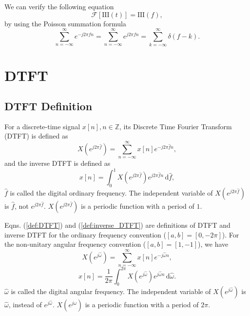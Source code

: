 \documentclass[journal,twoside]{IEEEtran}
\newcommand{\dd}{\,\mathrm{d}}
\begin{document}
We can verify the following equation
\begin{equation}
\mathscr{F}[\mathrm{III}(t)]=\mathrm{III}(f),\label{eqn:ctft_delta_comb}
\end{equation}
by using the Poisson summation formula \cite{ref:benedetto1997} 
\begin{equation}
\sum_{n=-\infty}^{\infty}e^{-j 2\pi f n} = \sum_{n=-\infty}^{\infty}e^{j 2\pi f n}=\sum_{k=-\infty}^{\infty}\delta(f-k).\label{eqn:Poisson_summation_formula}
\end{equation}



\section{DTFT}
\label{sec:DTFT}

\subsection{DTFT Definition}

For a discrete-time signal $x[n], n \in \mathbb{Z}$, its Discrete Time Fourier Transform (DTFT) is defined as
\begin{equation}
X(e^{j 2\pi\hat{f}}) = \sum_{n=-\infty}^{\infty}x[n]e^{-j 2\pi \hat{f} n},\label{def:DTFT}
\end{equation}
and the inverse DTFT is defined as
\begin{equation}
x[n] = \int_{0}^{1}X(e^{j 2\pi\hat{f}})e^{j 2\pi \hat{f} n}\dd \hat{f},\label{def:inverse_DTFT}
\end{equation}
$\hat{f}$ is called the digital ordinary frequency. The independent variable of $X(e^{j 2\pi\hat{f}})$ is $\hat{f}$, not $e^{j 2\pi\hat{f}}$. $X(e^{j 2\pi\hat{f}})$ is a periodic function with a period of $1$.

Eqns. (\ref{def:DTFT}) and (\ref{def:inverse_DTFT}) are definitions of DTFT and inverse DTFT for the ordinary frequency convention ($[a,b]=[0,-2\pi]$). For the non-unitary angular frequency convention ($[a,b]=[1,-1]$), we have \cite{ref:romberg2016_1}
\begin{equation}
X(e^{j \hat{\omega}}) = \sum_{n=-\infty}^{\infty}x[n]e^{-j\hat{\omega} n},
\end{equation}
\begin{equation}
x[n] = \frac{1}{2\pi} \int_{0}^{2\pi}X(e^{j\hat{\omega}})e^{j\hat{\omega} n}\dd \hat{\omega}.
\end{equation}
$\hat{\omega}$ is called the digital angular frequency. The independent variable of $X(e^{j \hat{\omega}})$ is $\hat{\omega}$, instead of $e^{j \hat{\omega}}$. $X(e^{j \hat{\omega}})$ is a periodic function with a period of $2\pi$.
\end{document}
